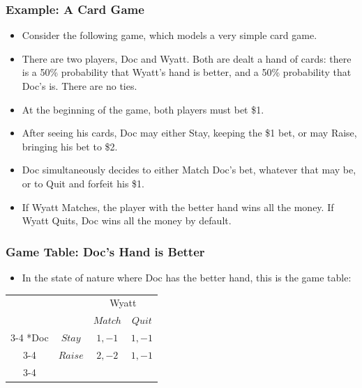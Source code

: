 \begin{frame}
\frametitle{Example: A Card Game}
\begin{itemize}
\item Consider the following game, which models a very simple card game.
\item There are two players, Doc and Wyatt. Both are dealt a hand of cards: there is a 50\% probability that Wyatt's hand is better, and a 50\% probability that Doc's is. There are no ties.
\item At the beginning of the game, both players must bet \$1. 
\item After seeing his cards, Doc may either Stay, keeping the \$1 bet, or may Raise, bringing his bet to \$2.
\item Doc simultaneously decides to either Match Doc's bet, whatever that may be, or to Quit and forfeit his \$1.
\item If Wyatt Matches, the player with the better hand wins all the money. If Wyatt Quits, Doc wins all the money by default.
\end{itemize}
\end{frame}


\begin{frame}
\frametitle{Game Table: Doc's Hand is Better}
\begin{itemize}
\item In the state of nature where Doc has the better hand, this is the game table:
\end{itemize}
\begin{table}[h]
\centering
 

\begin{tabular}{cc|c|c|}
& \multicolumn{1}{c}{} & \multicolumn{2}{c}{Wyatt}\\
& \multicolumn{1}{c}{} & \multicolumn{1}{c}{$Match$}  & \multicolumn{1}{c}{$Quit$} \\\cline{3-4}
\multirow{2}*{Doc}  & $Stay$ & $1, -1$ & $1, -1$ \\\cline{3-4}
& $Raise$ & $2, -2$ & $1,-1$ \\\cline{3-4}
\end{tabular}
\end{table}
\end{frame}

